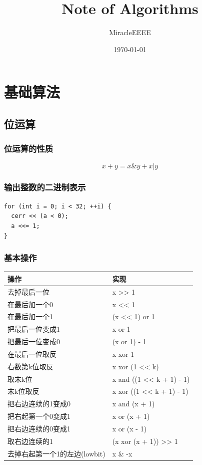 \documentclass[11pt]{article}
\author{MiracleEEEE}
\date{\today}
\title{Note of Algorithms}
\begin{document}
\maketitle
\tableofcontents


\section{基础算法}
\label{sec-1}
\subsection{位运算}
\label{sec-1-1}
\subsubsection{位运算的性质}
\label{sec-1-1-1}

$$x+y=x \& y + x | y$$ 

\subsubsection{输出整数的二进制表示}
\label{sec-1-1-2}

\begin{verbatim}
for (int i = 0; i < 32; ++i) {
  cerr << (a < 0);
  a <<= 1;
}
\end{verbatim}

\subsubsection{基本操作}
\label{sec-1-1-3}

\begin{center}
\begin{tabular}{ll}
操作 & 实现\\
\hline
去掉最后一位 & x >> 1\\
在最后加一个0 & x << 1\\
在最后加一个1 & (x << 1) or 1\\
把最后一位变成1 & x or 1\\
把最后一位变成0 & (x or 1) - 1\\
在最后一位取反 & x xor 1\\
右数第k位取反 & x xor (1 << k)\\
取末k位 & x and ((1 << k + 1) - 1)\\
末k位取反 & x xor ((1 << k + 1) - 1)\\
把右边连续的1变成0 & x and (x + 1)\\
把右起第一个0变成1 & x or (x + 1)\\
把右边连续的0变成1 & x or (x - 1)\\
取右边连续的1 & (x xor (x + 1)) >> 1\\
去掉右起第一个1的左边(lowbit) & x \& -x\\
\end{tabular}
\end{center}
\end{document}
